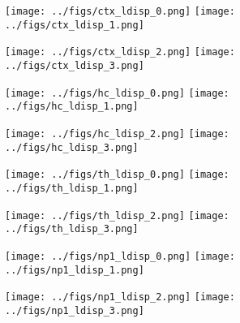 \documentclass[
  12pt,
]{article}
\theoremstyle{plain}
\theoremstyle{definition}
\theoremstyle{remark}
\newcommand{\1}[1]{\mathbb{1}_{{#1}}}
\begin{document}
\begin{figure}[hbtp]
\begin{adjustwidth*}{-1.6in}{-1.6in}
\begin{center}
\texttt{[image: ../figs/ctx\_ldisp\_0.png]}
\texttt{[image: ../figs/ctx\_ldisp\_1.png]}

\texttt{[image: ../figs/ctx\_ldisp\_2.png]}
\texttt{[image: ../figs/ctx\_ldisp\_3.png]}
\end{center}
\end{adjustwidth*}
\end{figure}

\begin{figure}[hbtp]
\begin{adjustwidth*}{-1.6in}{-1.6in}
\begin{center}
\texttt{[image: ../figs/hc\_ldisp\_0.png]}
\texttt{[image: ../figs/hc\_ldisp\_1.png]}

\texttt{[image: ../figs/hc\_ldisp\_2.png]}
\texttt{[image: ../figs/hc\_ldisp\_3.png]}
\end{center}
\end{adjustwidth*}
\end{figure}

\begin{figure}[hbtp]
\begin{adjustwidth*}{-1.6in}{-1.6in}
\begin{center}
\texttt{[image: ../figs/th\_ldisp\_0.png]}
\texttt{[image: ../figs/th\_ldisp\_1.png]}

\texttt{[image: ../figs/th\_ldisp\_2.png]}
\texttt{[image: ../figs/th\_ldisp\_3.png]}
\end{center}
\end{adjustwidth*}
\end{figure}

\begin{figure}[hbtp]
\begin{adjustwidth*}{-1.6in}{-1.6in}
\begin{center}
\texttt{[image: ../figs/np1\_ldisp\_0.png]}
\texttt{[image: ../figs/np1\_ldisp\_1.png]}

\texttt{[image: ../figs/np1\_ldisp\_2.png]}
\texttt{[image: ../figs/np1\_ldisp\_3.png]}
\end{center}
\end{adjustwidth*}
\end{figure}
\end{document}
